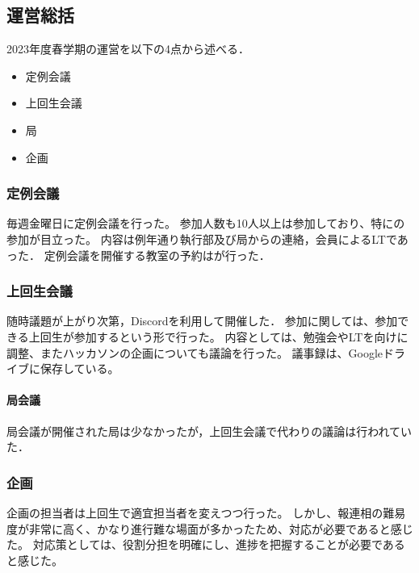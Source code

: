 \subsection*{運営総括}


2023年度春学期の運営を以下の4点から述べる．
\begin{itemize}
    \item 定例会議
    \item 上回生会議
    \item 局
    \item 企画
\end{itemize}

\subsubsection*{定例会議}
毎週金曜日に定例会議を行った。
参加人数も10人以上は参加しており、特に\firstGrade{}の参加が目立った。
内容は例年通り執行部及び局からの連絡，会員によるLTであった．
定例会議を開催する教室の予約は\kensuiChief{}が行った．

\subsubsection*{上回生会議}
随時議題が上がり次第，Discordを利用して開催した．
参加に関しては、参加できる上回生が参加するという形で行った。
内容としては、勉強会やLTを\firstGrade{}向けに調整、またハッカソンの企画についても議論を行った。
議事録は、Googleドライブに保存している。

\paragraph*{局会議}
局会議が開催された局は少なかったが，上回生会議で代わりの議論は行われていた．

\subsubsection*{企画}
企画の担当者は上回生で適宜担当者を変えつつ行った。
しかし、報連相の難易度が非常に高く、かなり進行難な場面が多かったため、対応が必要であると感じた。
対応策としては、役割分担を明確にし、進捗を把握することが必要であると感じた。